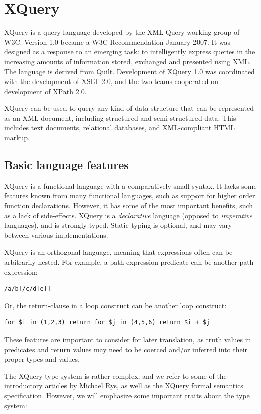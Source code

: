 \section{XQuery}
\label{sect:theory:xquery}

XQuery is a query language developed by the XML Query working group of W3C.
Version 1.0\cite{w3c00} became a W3C Recommendation January 2007. It was
designed as a response to an emerging task: to intelligently express queries in
the increasing amounts of information stored, exchanged and presented using
XML. The language is derived from Quilt\cite{quilt_queryLanguage}. Development
of XQuery 1.0 was coordinated with the development of XSLT 2.0, and the two
teams cooperated on development of XPath 2.0.

XQuery can be used to query any kind of data structure that can be represented
as an XML document, including structured and semi-structured data. This
includes text documents, relational databases, and XML-compliant HTML markup.

\subsection{Basic language features}
\label{sect:theory:xquery:basics}
XQuery is a functional language with a comparatively small syntax. It lacks
some features known from many functional languages, such as support for higher
order function declarations. However, it has some of the most important
benefits, such as a lack of side-effects. XQuery is a \textit{declarative}
language (opposed to \textit{imperative} languages), and is strongly typed.
Static typing is optional, and may vary between various implementations.


XQuery is an orthogonal language, meaning that expressions often can be
arbitrarily nested. For example, a path expression predicate can be another
path expression:
\begin{Verbatim}
/a/b[/c/d[e]]
\end{Verbatim}
Or, the return-clause in a loop construct can be another loop
construct:
\begin{Verbatim}
for $i in (1,2,3) return for $j in (4,5,6) return $i + $j
\end{Verbatim}

These features are important to consider for later translation, as truth values
in predicates and return values may need to be coerced and/or inferred into
their proper types and values.

The XQuery type system is rather complex, and we refer to some of the
introductory articles\cite{rys_xq_type_intro} by Michael Rys, as well as the
XQuery formal semantics specification\cite{xquery_semantics}. However, we will
emphasize some important traits about the type system: 

